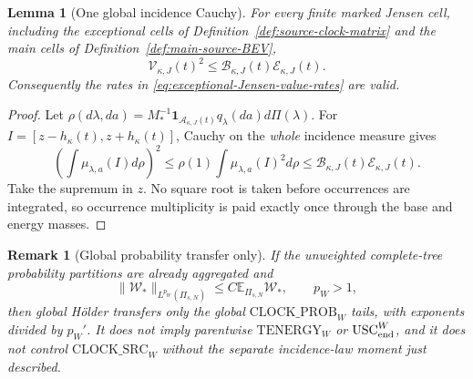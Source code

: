 \documentclass[11pt]{article}
\newtheorem{lemma}[theorem]{Lemma}
\newtheorem{remark}[theorem]{Remark}
\newcommand{\one}{\mathbf 1}
\begin{document}
\begin{lemma}[One global incidence Cauchy]
\label{lem:global-incidence-cauchy}
For every finite marked Jensen cell, including the exceptional cells of
Definition~\ref{def:source-clock-matrix} and the main cells of
Definition~\ref{def:main-source-BEV},
\begin{equation}
\label{eq:global-incidence-cauchy}
 \mathcal V_{\kappa,J}(t)^2
 \le \mathcal B_{\kappa,J}(t)\mathcal E_{\kappa,J}(t).
\end{equation}
Consequently the rates in
\eqref{eq:exceptional-Jensen-value-rates} are valid.
\end{lemma}

\begin{proof}
Let $\rho(d\lambda,da)=M_*^{-1}
\one_{\mathcal A_{\kappa,J}(t)}q_\lambda(da)d\Pi(\lambda)$.
For $I=[z-h_\kappa(t),z+h_\kappa(t)]$, Cauchy on the \emph{whole}
incidence measure gives
\[
 \left(\int\mu_{\lambda,a}(I)d\rho\right)^2
 \le \rho(1)\int\mu_{\lambda,a}(I)^2d\rho
 \le \mathcal B_{\kappa,J}(t)\mathcal E_{\kappa,J}(t).
\]
Take the supremum in $z$.  No square root is taken before occurrences are
integrated, so occurrence multiplicity is paid exactly once through the base
and energy masses.
\end{proof}

\begin{remark}[Global probability transfer only]
\label{rem:global-holder-only}
If the unweighted complete-tree probability partitions are already
aggregated and
\begin{equation}
\label{eq:full-product-Lp-energy-route}
 \|\mathscr W_*\|_{L^{p_W}(\Pi_{s,N})}
 \le C\mathbb E_{\Pi_{s,N}}\mathscr W_*,\qquad p_W>1,
\end{equation}
then global H\"older transfers only the global
$\mathrm{CLOCK\_PROB}_{W}$ tails, with exponents divided by $p_W'$.  It
does not imply parentwise $\mathrm{TENERGY}_{W}$ or
$\mathrm{USC}_{\rm end}^{W}$, and it does not control
$\mathrm{CLOCK\_SRC}_{W}$ without the separate incidence-law moment just
described.
\end{remark}
\end{document}
